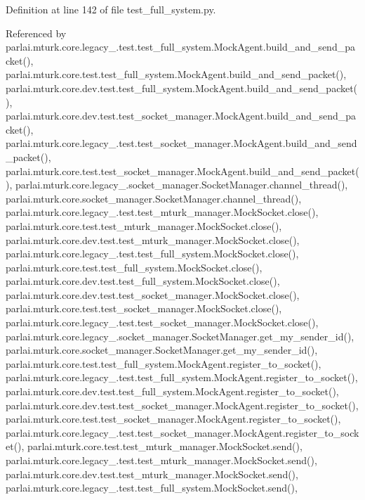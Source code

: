 Definition at line 142 of file test\+\_\+full\+\_\+system.\+py.



Referenced by parlai.\+mturk.\+core.\+legacy\+\_.\+test.\+test\+\_\+full\+\_\+system.\+Mock\+Agent.\+build\+\_\+and\+\_\+send\+\_\+packet(), parlai.\+mturk.\+core.\+test.\+test\+\_\+full\+\_\+system.\+Mock\+Agent.\+build\+\_\+and\+\_\+send\+\_\+packet(), parlai.\+mturk.\+core.\+dev.\+test.\+test\+\_\+full\+\_\+system.\+Mock\+Agent.\+build\+\_\+and\+\_\+send\+\_\+packet(), parlai.\+mturk.\+core.\+dev.\+test.\+test\+\_\+socket\+\_\+manager.\+Mock\+Agent.\+build\+\_\+and\+\_\+send\+\_\+packet(), parlai.\+mturk.\+core.\+legacy\+\_.\+test.\+test\+\_\+socket\+\_\+manager.\+Mock\+Agent.\+build\+\_\+and\+\_\+send\+\_\+packet(), parlai.\+mturk.\+core.\+test.\+test\+\_\+socket\+\_\+manager.\+Mock\+Agent.\+build\+\_\+and\+\_\+send\+\_\+packet(), parlai.\+mturk.\+core.\+legacy\+\_.\+socket\+\_\+manager.\+Socket\+Manager.\+channel\+\_\+thread(), parlai.\+mturk.\+core.\+socket\+\_\+manager.\+Socket\+Manager.\+channel\+\_\+thread(), parlai.\+mturk.\+core.\+legacy\+\_.\+test.\+test\+\_\+mturk\+\_\+manager.\+Mock\+Socket.\+close(), parlai.\+mturk.\+core.\+test.\+test\+\_\+mturk\+\_\+manager.\+Mock\+Socket.\+close(), parlai.\+mturk.\+core.\+dev.\+test.\+test\+\_\+mturk\+\_\+manager.\+Mock\+Socket.\+close(), parlai.\+mturk.\+core.\+legacy\+\_.\+test.\+test\+\_\+full\+\_\+system.\+Mock\+Socket.\+close(), parlai.\+mturk.\+core.\+test.\+test\+\_\+full\+\_\+system.\+Mock\+Socket.\+close(), parlai.\+mturk.\+core.\+dev.\+test.\+test\+\_\+full\+\_\+system.\+Mock\+Socket.\+close(), parlai.\+mturk.\+core.\+dev.\+test.\+test\+\_\+socket\+\_\+manager.\+Mock\+Socket.\+close(), parlai.\+mturk.\+core.\+test.\+test\+\_\+socket\+\_\+manager.\+Mock\+Socket.\+close(), parlai.\+mturk.\+core.\+legacy\+\_.\+test.\+test\+\_\+socket\+\_\+manager.\+Mock\+Socket.\+close(), parlai.\+mturk.\+core.\+legacy\+\_.\+socket\+\_\+manager.\+Socket\+Manager.\+get\+\_\+my\+\_\+sender\+\_\+id(), parlai.\+mturk.\+core.\+socket\+\_\+manager.\+Socket\+Manager.\+get\+\_\+my\+\_\+sender\+\_\+id(), parlai.\+mturk.\+core.\+test.\+test\+\_\+full\+\_\+system.\+Mock\+Agent.\+register\+\_\+to\+\_\+socket(), parlai.\+mturk.\+core.\+legacy\+\_.\+test.\+test\+\_\+full\+\_\+system.\+Mock\+Agent.\+register\+\_\+to\+\_\+socket(), parlai.\+mturk.\+core.\+dev.\+test.\+test\+\_\+full\+\_\+system.\+Mock\+Agent.\+register\+\_\+to\+\_\+socket(), parlai.\+mturk.\+core.\+dev.\+test.\+test\+\_\+socket\+\_\+manager.\+Mock\+Agent.\+register\+\_\+to\+\_\+socket(), parlai.\+mturk.\+core.\+test.\+test\+\_\+socket\+\_\+manager.\+Mock\+Agent.\+register\+\_\+to\+\_\+socket(), parlai.\+mturk.\+core.\+legacy\+\_.\+test.\+test\+\_\+socket\+\_\+manager.\+Mock\+Agent.\+register\+\_\+to\+\_\+socket(), parlai.\+mturk.\+core.\+test.\+test\+\_\+mturk\+\_\+manager.\+Mock\+Socket.\+send(), parlai.\+mturk.\+core.\+legacy\+\_.\+test.\+test\+\_\+mturk\+\_\+manager.\+Mock\+Socket.\+send(), parlai.\+mturk.\+core.\+dev.\+test.\+test\+\_\+mturk\+\_\+manager.\+Mock\+Socket.\+send(), parlai.\+mturk.\+core.\+legacy\+\_.\+test.\+test\+\_\+full\+\_\+system.\+Mock\+Socket.\+send(), 